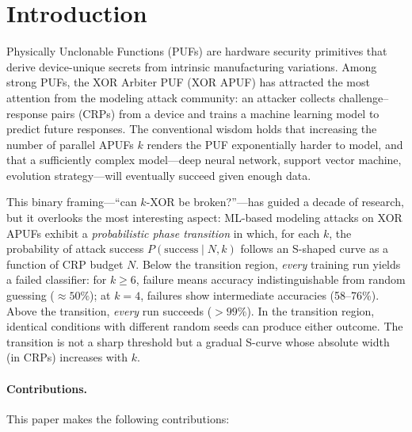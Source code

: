 \section{Introduction}
\label{sec:introduction}

Physically Unclonable Functions (PUFs) are hardware security primitives that
derive device-unique secrets from intrinsic manufacturing variations.  Among
strong PUFs, the XOR Arbiter PUF (XOR APUF) has attracted the most attention
from the modeling attack community: an attacker collects challenge--response
pairs (CRPs) from a device and trains a machine learning model to predict
future responses.  The conventional wisdom holds that increasing the number
of parallel APUFs $k$ renders the PUF exponentially harder to model, and
that a sufficiently complex model---deep neural network, support vector
machine, evolution strategy---will eventually succeed given enough data.

This binary framing---``can $k$-XOR be broken?''---has guided a decade of
research, but it overlooks the most interesting aspect: ML-based modeling
attacks on XOR APUFs exhibit a \emph{probabilistic phase transition} in which,
for each $k$, the probability of attack success $P(\text{success} \mid N, k)$
follows an S-shaped curve as a function of CRP budget $N$.  Below the
transition region, \emph{every} training run yields a failed classifier:
for $k \geq 6$, failure means accuracy indistinguishable from random guessing
($\approx 50\%$); at $k = 4$, failures show intermediate accuracies
(58--76\%).  Above the transition, \emph{every} run succeeds ($> 99\%$).
In the transition region, identical conditions with different random seeds
can produce either outcome.  The transition is not a sharp threshold but a
gradual S-curve whose absolute width (in CRPs) increases with $k$.

\paragraph{Contributions.}
This paper makes the following contributions:

